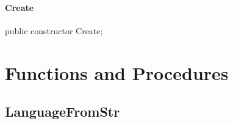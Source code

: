 \documentclass{report}
\newif\ifpdf
\begin{document}
\paragraph*{Create}\hspace*{\fill}

\label{PasDoc_Languages.TPasDocLanguages-Create}
\begin{list}{}{
\setlength{\itemindent}{0cm}
\setlength{\listparindent}{0cm}
\setlength{\leftmargin}{\evensidemargin}
\addtolength{\leftmargin}{\tmplength}
\settowidth{\labelsep}{X}
\addtolength{\leftmargin}{\labelsep}
\setlength{\labelwidth}{\tmplength}
}
\item[\textbf{Declaration}\hfill]
\ifpdf
\begin{flushleft}
\fi
\begin{ttfamily}
public constructor Create;\end{ttfamily}

\ifpdf
\end{flushleft}
\fi

\end{list}
\section{Functions and Procedures}
\ifpdf
\subsection*{\large{\textbf{LanguageFromStr}}\normalsize\hspace{1ex}\hrulefill}
\else
\end{document}
